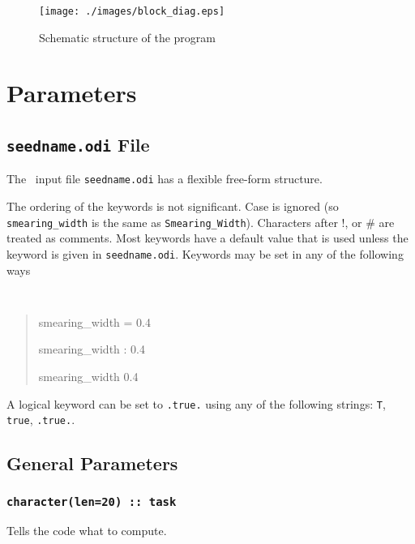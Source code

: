 \documentclass[a4paper,11pt,twoside]{book}
\begin{document}
{\begin{figure}
\begin{center}
\texttt{[image: ./images/block\_diag.eps]}
\caption{Schematic structure of the program} \label{fig:prog_structure}
\end{center}
\end{figure}

\chapter{Parameters}\label{chap:parameters}

\section{{\tt seedname.odi} File}
The \optados\ input file {\tt seedname.odi} has a flexible free-form
structure.

The ordering of the keywords is not significant. Case is ignored (so
\verb#smearing_width# is the same as \verb#Smearing_Width#). Characters after !, or \#
are treated as comments. Most keywords have a default value that is
used unless the keyword is given in {\tt seedname.odi}. Keywords may be set
in any of the following ways
{\tt
\begin{quote}
smearing\_width = 0.4

smearing\_width : 0.4

smearing\_width   0.4
\end{quote} }
A logical keyword can be set to {\tt .true.} using any of the following
strings: {\tt T}, {\tt true}, {\tt .true.}.


\clearpage


\section{General Parameters}
\subsection[task]{\tt character(len=20) :: task}

Tells the code what to compute.

}
\end{document}
